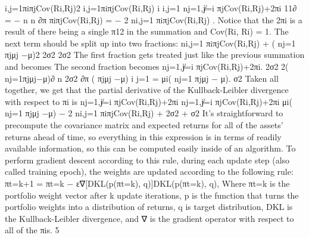 \documentclass{article}
\begin{document}
i,j=1πiπjCov(Ri,Rj)2 i,j=1πiπjCov(Ri,Rj) i i,j=1  nj=1,j̸=i πjCov(Ri,Rj)+2πi
11∂ = −  n   n ∂π
πiπjCov(Ri,Rj)
     = − 2 ni,j=1 πiπjCov(Ri,Rj) .
Notice that the 2πi is a result of there being a single π12 in the summation and Cov(Ri, Ri) = 1. The
next term should be split up into two fractions:
 ni,j=1 πiπjCov(Ri,Rj) + ( nj=1 πjμj −μ)2 2σ2 2σ2
The first fraction gets treated just like the previous summation and becomes
    The second fraction becomes
 nj=1,j̸=i πjCov(Ri,Rj)+2πi. 2σ2
2( nj=1πjμj−μ)∂  n
2σ2 ∂π ( πjμj −μ)
i j=1
= μi( nj=1 πjμj − μ). σ2
   Taken all together, we get that the partial derivative of the Kullback-Leibler divergence with respect to πi is
 nj=1,j̸=i πjCov(Ri,Rj)+2πi  nj=1,j̸=i πjCov(Ri,Rj)+2πi μi( nj=1 πjμj −μ) − 2 ni,j=1 πiπjCov(Ri,Rj) + 2σ2 + σ2
It’s straightforward to precompute the covariance matrix and expected returns for all of the assets’ returns ahead of time, so everything in this expression is in terms of readily available information, so this can be computed easily inside of an algorithm.
To perform gradient descent according to this rule, during each update step (also called training epoch), the weights are updated according to the following rule:
πt=k+1 = πt=k − ε∇[DKL(p(πt=k), q)]DKL(p(πt=k), q),
Where πt=k is the portfolio weight vector after k update iterations, p is the function that turns the portfolio weights into a distribution of returns, q is target distribution, DKL is the Kullback-Leibler divergence, and ∇ is the gradient operator with respect to all of the πis.
   5
\end{document}
